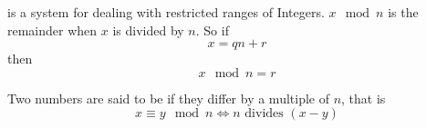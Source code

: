  is a system for dealing with restricted ranges of Integers. $x \mod{n}$ is
the remainder when $x$ is divided by $n$. So if 
$$x = qn + r$$
then
$$x \mod{n} = r$$

Two numbers are said to be  if they differ by a multiple of $n$, that is
$$ x \equiv y \mod{n} \iff n \text{ divides } (x - y)$$ 
